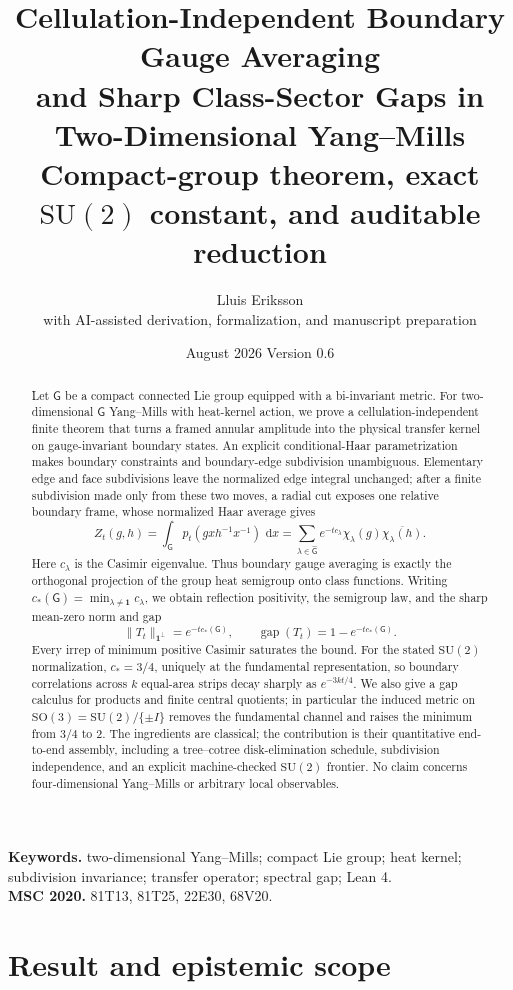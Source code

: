 \documentclass[11pt]{article}
\title{\textbf{Cellulation-Independent Boundary Gauge Averaging\\
and Sharp Class-Sector Gaps in Two-Dimensional Yang--Mills}\\[3mm]
\large Compact-group theorem, exact $\mathrm{SU}(2)$ constant, and auditable reduction}
\author{Lluis Eriksson\\
\small with AI-assisted derivation, formalization, and manuscript preparation}
\date{August 2026 \quad Version 0.6}
\theoremstyle{remark}
\newcommand{\SU}{\mathrm{SU}(2)}
\newcommand{\G}{\mathsf G}
\newcommand{\dd}{\,\mathrm d}
\begin{document}
\maketitle

\begin{abstract}
Let $\G$ be a compact connected Lie group equipped with a bi-invariant metric.
For two-dimensional $\G$ Yang--Mills with heat-kernel action, we prove a
cellulation-independent finite theorem that turns a framed annular amplitude
into the physical transfer kernel on gauge-invariant boundary states.
An explicit conditional-Haar parametrization makes boundary constraints and
boundary-edge subdivision unambiguous.  Elementary edge and face subdivisions
leave the normalized edge integral unchanged; after a finite subdivision made
only from these two moves, a radial cut exposes one relative
boundary frame, whose normalized Haar average gives
\[
 Z_t(g,h)=\int_{\G}p_t(gxh^{-1}x^{-1})\,\dd x
 =\sum_{\lambda\in\widehat{\G}}e^{-t c_\lambda}
   \chi_\lambda(g)\overline{\chi_\lambda(h)}.
\]
Here $c_\lambda$ is the Casimir eigenvalue.  Thus boundary gauge averaging is
exactly the orthogonal projection of the group heat semigroup onto class
functions.  Writing $c_*(\G)=\min_{\lambda\ne\mathbf1}c_\lambda$, we obtain
reflection positivity, the semigroup law, and the sharp mean-zero norm and gap
\[
 \|T_t\|_{\mathbf1^\perp}=e^{-tc_*(\G)},\qquad
 \operatorname{gap}(T_t)=1-e^{-tc_*(\G)}.
\]
Every irrep of minimum positive Casimir saturates the bound.  For the stated
$\SU$ normalization, $c_*=3/4$, uniquely at the fundamental representation,
so boundary correlations across $k$ equal-area strips decay sharply as
$e^{-3kt/4}$.  We also give a gap calculus for products and finite central
quotients; in particular the induced metric on
$\mathrm{SO}(3)=\SU/\{\pm I\}$ removes the fundamental channel and raises the
minimum from $3/4$ to $2$.  The ingredients are classical; the contribution is their
  quantitative end-to-end assembly, including a tree--cotree disk-elimination
  schedule, subdivision independence, and an explicit machine-checked $\SU$
  frontier.  No claim concerns four-dimensional
Yang--Mills or arbitrary local observables.
\end{abstract}

\noindent\textbf{Keywords.} two-dimensional Yang--Mills; compact Lie group;
heat kernel; subdivision invariance; transfer operator; spectral gap; Lean 4.\\
\textbf{MSC 2020.} 81T13, 81T25, 22E30, 68V20.

\section{Result and epistemic scope}
\end{document}
